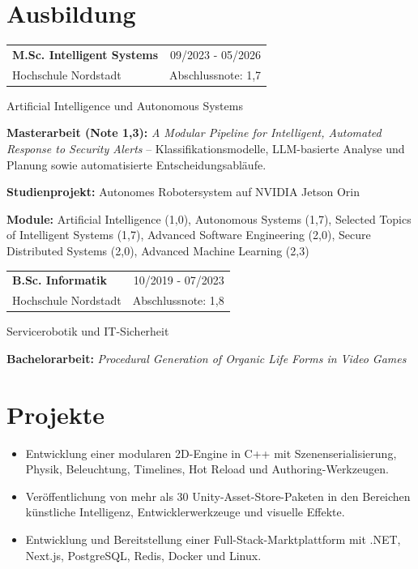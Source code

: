 \documentclass[10pt,a4paper]{article}
\makeatletter
\newcommand{\entry}[4]{%
  \begin{tabular*}{\linewidth}{@{}l@{\extracolsep{\fill}}r@{}}
    \textbf{#1} & {\small\color{grey}#2}\\
    {\small #3} & {\small\color{grey}#4}
  \end{tabular*}\par\nopagebreak[4]}
\newcommand{\note}[2]{{\small\textbf{#1:} #2}\par}
\makeatother
\begin{document}
\section{Ausbildung}
\entry{M.Sc. Intelligent Systems}{09/2023 - 05/2026}{Hochschule Nordstadt}{Abschlussnote: 1,7}
\vspace{1pt}
{\small Artificial Intelligence und Autonomous Systems}\par
\note{Masterarbeit (Note 1,3)}{\textit{A Modular Pipeline for Intelligent, Automated Response to Security Alerts} -- Klassifikationsmodelle, LLM-basierte Analyse und Planung sowie automatisierte Entscheidungsabläufe.}
\note{Studienprojekt}{Autonomes Robotersystem auf NVIDIA Jetson Orin}
\note{Module}{Artificial Intelligence (1,0), Autonomous Systems (1,7), Selected Topics of Intelligent Systems (1,7), Advanced Software Engineering (2,0), Secure Distributed Systems (2,0), Advanced Machine Learning (2,3)}
\vspace{4pt}
\entry{B.Sc. Informatik}{10/2019 - 07/2023}{Hochschule Nordstadt}{Abschlussnote: 1,8}
\vspace{1pt}
{\small Servicerobotik und IT-Sicherheit}\par
\note{Bachelorarbeit}{\textit{Procedural Generation of Organic Life Forms in Video Games}}

\section{Projekte}
\begin{itemize}
  \item Entwicklung einer modularen 2D-Engine in C++ mit Szenenserialisierung, Physik, Beleuchtung, Timelines, Hot Reload und Authoring-Werkzeugen.
  \item Veröffentlichung von mehr als 30 Unity-Asset-Store-Paketen in den Bereichen künstliche Intelligenz, Entwicklerwerkzeuge und visuelle Effekte.
  \item Entwicklung und Bereitstellung einer Full-Stack-Marktplattform mit .NET, Next.js, PostgreSQL, Redis, Docker und Linux.
\end{itemize}
\end{document}
